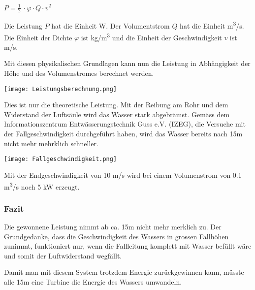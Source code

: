 \begin{center}
\(P =\frac 12\ \cdot \varphi \cdot Q \cdot v^2\)
\end{center}

Die Leistung \(P\) hat die Einheit \si{W}. Der Volumentstrom \(Q\) hat die Einheit \si{m^3/s}. Die Einheit der Dichte \(\varphi\) ist \si{kg/m^3} und die Einheit der Geschwindigkeit \(v\) ist \si{m/s}.

\bigskip


Mit diesen physikalischen Grundlagen kann nun die Leistung in Abhängigkeit der Höhe und des Volumenstromes berechnet werden. 

\begin{center}
\texttt{[image: Leistungsberechnung.png]}
\end{center}

Dies ist nur die theoretische Leistung. Mit der Reibung am Rohr und dem Widerstand der Luftsäule wird das Wasser stark abgebrämst. Gemäss dem Informationszentrum Entwässerungstechnik Guss e.V. (IZEG), die Versuche mit der Fallgeschwindigkeit durchgeführt haben, wird das Wasser bereits nach 15\si{m} nicht mehr mehrklich schneller.

\begin{center}
\texttt{[image: Fallgeschwindigkeit.png]}
\end{center}

Mit der Endgeschwindigkeit von 10 \si{m/s} wird bei einem Volumenstrom von 0.1 \si{m^3/s} noch 5 \si{kW} erzeugt.

\subsubsection{Fazit}

Die gewonnene Leistung nimmt ab ca. 15\si{m} nicht mehr merklich zu. Der Grundgedanke, dass die Geschwindigkeit des Wassers in grossen Fallhöhen zunimmt, funktioniert nur, wenn die Fallleitung komplett mit Wasser befüllt wäre und somit der Luftwiderstand wegfällt.

Damit man mit diesem System trotzdem Energie zurückgewinnen kann, müsste alle 15\si{m} eine Turbine die Energie des Wassers umwandeln.

\clearpage 





